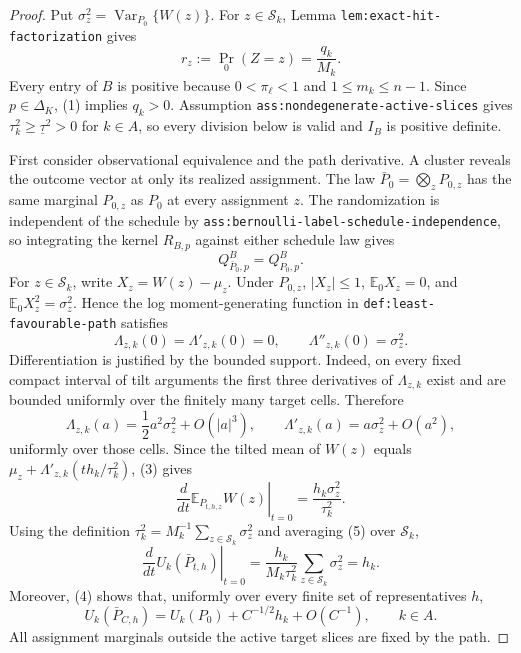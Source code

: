 \documentclass{article}
\begin{document}
\begin{proof}
Put \(\sigma_z^2=\operatorname{Var}_{P_0}\{W(z)\}\).  For \(z\in\mathcal S_k\), Lemma \texttt{lem:exact-hit-factorization} gives
\[
r_z:=\Pr_0(Z=z)=\frac{q_k}{M_k}.
\tag{1}
\]
Every entry of \(B\) is positive because \(0<\pi_\ell<1\) and \(1\leq m_k\leq n-1\).  Since \(p\in\Delta_K\), (1) implies \(q_k>0\).  Assumption \texttt{ass:nondegenerate-active-slices} gives \(\tau_k^2\geq\underline\tau^2>0\) for \(k\in A\), so every division below is valid and \(I_B\) is positive definite.

First consider observational equivalence and the path derivative.  A cluster reveals the outcome vector at only its realized assignment.  The law \(\bar P_0=\bigotimes_zP_{0,z}\) has the same marginal \(P_{0,z}\) as \(P_0\) at every assignment \(z\).  The randomization is independent of the schedule by \texttt{ass:bernoulli-label-schedule-independence}, so integrating the kernel \(R_{B,p}\) against either schedule law gives
\[
Q^B_{\bar P_0,p}=Q^B_{P_0,p}.
\tag{2}
\]
For \(z\in\mathcal S_k\), write \(X_z=W(z)-\mu_z\).  Under \(P_{0,z}\), \(|X_z|\leq1\), \(\mathbb E_0X_z=0\), and \(\mathbb E_0X_z^2=\sigma_z^2\).  Hence the log moment-generating function in \texttt{def:least-favourable-path} satisfies
\[
\Lambda_{z,k}(0)=\Lambda'_{z,k}(0)=0,
\qquad
\Lambda''_{z,k}(0)=\sigma_z^2.
\tag{3}
\]
Differentiation is justified by the bounded support.  Indeed, on every fixed compact interval of tilt arguments the first three derivatives of \(\Lambda_{z,k}\) exist and are bounded uniformly over the finitely many target cells.  Therefore
\[
\Lambda_{z,k}(a)=\frac12a^2\sigma_z^2+O(|a|^3),
\qquad
\Lambda'_{z,k}(a)=a\sigma_z^2+O(a^2),
\tag{4}
\]
uniformly over those cells.  Since the tilted mean of \(W(z)\) equals \(\mu_z+\Lambda'_{z,k}(t h_k/\tau_k^2)\), (3) gives
\[
\left.\frac{d}{dt}\mathbb E_{P_{t,h,z}}W(z)\right|_{t=0}
=\frac{h_k\sigma_z^2}{\tau_k^2}.
\tag{5}
\]
Using the definition \(\tau_k^2=M_k^{-1}\sum_{z\in\mathcal S_k}\sigma_z^2\) and averaging (5) over \(\mathcal S_k\),
\[
\left.\frac{d}{dt}U_k(\bar P_{t,h})\right|_{t=0}
=\frac{h_k}{M_k\tau_k^2}\sum_{z\in\mathcal S_k}\sigma_z^2
=h_k.
\tag{6}
\]
Moreover, (4) shows that, uniformly over every finite set of representatives \(h\),
\[
U_k(\bar P_{C,h})=U_k(P_0)+C^{-1/2}h_k+O(C^{-1}),
\qquad k\in A.
\tag{7}
\]
All assignment marginals outside the active target slices are fixed by the path.


\end{proof}
\end{document}
